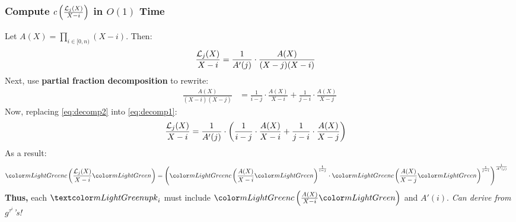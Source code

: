 \begin{frame}
    \frametitle{ Compute $c\left(\frac{\mathcal{L}_j(X)}{X-i}\right)$ in $O(1)$ Time}

    \pause
    Let $A(X)=\prod_{i\in[0,n)} (X-i)$.\pause\xspace
    Then: %
    \begin{align}
    \label{eq:decomp1}
    \frac{\mathcal{L}_j(X)}{X-i} &= \frac{1}{A'(j)}\cdot \frac{A(X)}{(X-j)(X-i)}
    \end{align}
    Next, use \textbf{partial fraction decomposition} to rewrite:\pause
    \begin{align}
        \label{eq:decomp2}
        \frac{A(X)}{(X-i)(X-j)} &= \frac{1}{i-j}\cdot \frac{A(X)}{X-i} + \frac{1}{j-i}\cdot \frac{A(X)}{X-j}
    \end{align}
    \pause
    Now, replacing \cref{eq:decomp2} into \cref{eq:decomp1}:
    \begin{align}
        \frac{\mathcal{L}_j(X)}{X-i} &= \frac{1}{A'(j)}\cdot \left(\frac{1}{i-j}\cdot \frac{A(X)}{X-i} + \frac{1}{j-i}\cdot \frac{A(X)}{X-j}\right)
    \end{align}\pause
    As a result:\pause
    \begin{align}
        \cm{\frac{\lagr_j(X)}{X-i}} &= \left(\cm{\frac{A(X)}{X-i}}^{\frac{1}{i-j}}\cdot \cm{\frac{A(X)}{X-j}}^{\frac{1}{j-i}}\right)^{\frac{1}{A'(j)}}
    \end{align}
    \pause
    \textbf{Thus,} each $\upk_i$ must include $\cm{\frac{A(X)}{X-i}}$ and $A'(i)$.\pause\xspace
    \textit{Can derive from $g^{\tau^i}$'s!}
\end{frame}
